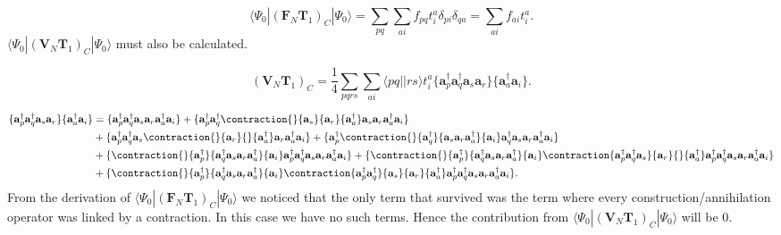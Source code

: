 \documentclass[graybox,sectrefs,envcountresetchap,open=right]{svmonodo}
\begin{document}
\begin{equation}
\langle \Psi_0 | (\mathbf{F}_N \mathbf{T}_1)_C | \Psi_0 \rangle =  \sum_{pq} \sum_{ai} f_{pq} t_i^a\delta_{pi} \delta_{qa} = \sum_{ai} f_{ai} t_i^a . \label{f_t1}
\end{equation} 
$\langle \Psi_0 | (\mathbf{V}_N \mathbf{T}_1)_C | \Psi_0 \rangle$ must also be calculated.

\begin{equation}
(\mathbf{V}_N \mathbf{T}_1 )_C = \frac{1}{4} \sum_{pqrs} \sum_{ai} \langle pq||rs \rangle t_i^a \{\mathbf{a}^{\dagger}_p \mathbf{a}^{\dagger}_q \mathbf{a}_s \mathbf{a}_r \} \{\mathbf{a}_a^{\dagger} \mathbf{a}_i \} .
\end{equation} 

\begin{align}
\{\mathbf{a}^{\dagger}_p \mathbf{a}^{\dagger}_q \mathbf{a}_s \mathbf{a}_r \} \{\mathbf{a}_a^{\dagger} \mathbf{a}_i \} & = \{
\mathbf{a}^{\dagger}_p \mathbf{a}^{\dagger}_q \mathbf{a}_s \mathbf{a}_r \mathbf{a}_a^{\dagger} \mathbf{a}_i 
\} 
+ 
\{ \mathbf{a}^{\dagger}_p \mathbf{a}^{\dagger}_q
\contraction{}{\mathbf{a}_s}{\mathbf{a}_r}{\mathbf{a}_a^{\dagger}}
 \mathbf{a}_s \mathbf{a}_r \mathbf{a}_a^{\dagger}
  \mathbf{a}_i 
\}  \\ &
+ 
\{ \mathbf{a}^{\dagger}_p \mathbf{a}^{\dagger}_q \mathbf{a}_s
\contraction{}{\mathbf{a}_r}{}{\mathbf{a}_a^{\dagger}}
\mathbf{a}_r \mathbf{a}_a^{\dagger}
\mathbf{a}_i
\}
+ \{ \mathbf{a}^{\dagger}_p
\contraction{}{\mathbf{a}^{\dagger}_q}{\mathbf{a}_s \mathbf{a}_r \mathbf{a}_a^{\dagger}}{\mathbf{a}_i}
\mathbf{a}^{\dagger}_q \mathbf{a}_s \mathbf{a}_r \mathbf{a}_a^{\dagger} \mathbf{a}_i \} \nonumber \\ &
+ \{
\contraction{}{\mathbf{a}^{\dagger}_p}{\mathbf{a}^{\dagger}_q \mathbf{a}_s \mathbf{a}_r \mathbf{a}_a^{\dagger}}{\mathbf{a}_i}
\mathbf{a}^{\dagger}_p \mathbf{a}^{\dagger}_q \mathbf{a}_s \mathbf{a}_r \mathbf{a}_a^{\dagger} \mathbf{a}_i
\}
+ \{
\contraction{}{\mathbf{a}^{\dagger}_p}{\mathbf{a}^{\dagger}_q \mathbf{a}_s \mathbf{a}_r \mathbf{a}_a^{\dagger}}{\mathbf{a}_i}
\contraction{\mathbf{a}^{\dagger}_p \mathbf{a}^{\dagger}_q \mathbf{a}_s}{\mathbf{a}_r}{}{\mathbf{a}_a^{\dagger}}
\mathbf{a}^{\dagger}_p \mathbf{a}^{\dagger}_q \mathbf{a}_s \mathbf{a}_r \mathbf{a}_a^{\dagger} \mathbf{a}_i
\} \nonumber \\ &
+ \{
\contraction{}{\mathbf{a}^{\dagger}_p}{\mathbf{a}^{\dagger}_q \mathbf{a}_s \mathbf{a}_r \mathbf{a}_a^{\dagger}}{\mathbf{a}_i}
\contraction{\mathbf{a}^{\dagger}_p \mathbf{a}^{\dagger}_q}{\mathbf{a}_s}{\mathbf{a}_r}{\mathbf{a}_a^{\dagger}}
\mathbf{a}^{\dagger}_p \mathbf{a}^{\dagger}_q \mathbf{a}_s \mathbf{a}_r \mathbf{a}_a^{\dagger} \mathbf{a}_i
\} . \nonumber
\end{align} 
From the derivation of $\langle \Psi_0 | (\mathbf{F}_N \mathbf{T}_1)_C | \Psi_0 \rangle$ we noticed that the only term that survived was the term where every construction/annihilation operator was linked by a contraction. In this case we have no such terms. Hence the contribution from $\langle \Psi_0 | (\mathbf{V}_N \mathbf{T}_1)_C | \Psi_0 \rangle$ will be 0. \\
\end{document}
